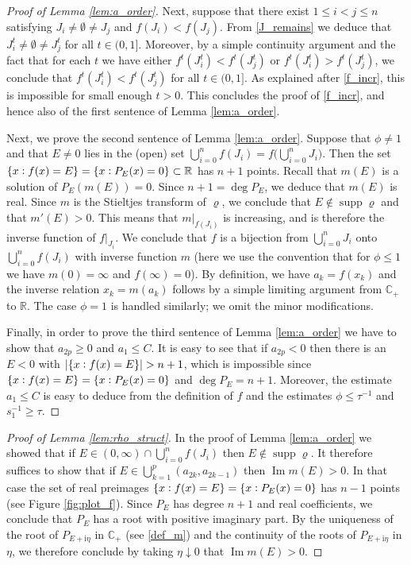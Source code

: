 \documentclass[11pt]{article} %
\numberwithin{equation}{section}
\numberwithin{figure}{section}
\theoremstyle{plain} %
\theoremstyle{definition} %
\newcommand{\R}{\mathbb{R}}
\newcommand{\C}{\mathbb{C}}
\newcommand{\ii}{\mathrm{i}}
\newcommand{\col}{\mathrel{\vcenter{\baselineskip0.75ex \lineskiplimit0pt \hbox{.}\hbox{.}}}}
\renewcommand{\leq}{\leqslant}
\renewcommand{\geq}{\geqslant}
\newcommand{\pb}[1]{\bigl({#1}\bigr)}
\newcommand{\h}[1]{\{{#1}\}}
\newcommand{\abs}[1]{\lvert #1 \rvert}
\DeclareMathOperator{\supp}{supp}
\DeclareMathOperator{\im}{Im}
\begin{document}
\begin{proof}[Proof of Lemma \ref{lem:a_order}]
Next, suppose that there exist $1 \leq i < j \leq n$ satisfying $J_i \neq \emptyset \neq J_j$ and $f(J_i) < f(J_j)$. From \eqref{J_remains} we deduce that $J_i^t \neq \emptyset \neq J_j^t$ for all $t \in (0,1]$. Moreover, by a simple continuity argument and the fact that for each $t$ we have either $f^t(J_i^t) < f^t(J_j^t)$ or  $f^t(J_i^t) > f^t(J_j^t)$, we conclude that $f^t(J_i^t) < f^t(J_j^t)$ for all $t \in (0,1]$. As explained after \eqref{f_incr}, this is impossible for small enough $t > 0$. This concludes the proof of \eqref{f_incr}, and hence also of the first sentence of Lemma \ref{lem:a_order}.

Next, we prove the second sentence of Lemma \ref{lem:a_order}. Suppose that $\phi \neq 1$ and that $E \neq 0$ lies in the (open) set $\bigcup_{i = 0}^n f(J_i) = f \pb{\bigcup_{i = 0}^n J_i}$. Then the set $\h{x \col f(x) = E} = \h{x \col P_E(x) = 0} \subset \R$ has $n+1$ points. Recall that $m(E)$ is a solution of $P_{E}(m(E)) = 0$. Since $n+1 = \deg P_E$, we deduce that $m(E)$ is real. Since $m$ is the Stieltjes transform of $\varrho$, we conclude that $E \notin \supp \varrho$ and that $m'(E) > 0$. This means that $m \vert_{f(J_i)}$ is increasing, and is therefore the inverse function of $f \vert_{J_i}$. We conclude that $f$ is a bijection from $\bigcup_{i = 0}^n J_i$ onto $\bigcup_{i = 0}^n f(J_i)$ with inverse function $m$ (here we use the convention that for $\phi \leq 1$ we have $m(0) = \infty$ and $f(\infty) = 0$). By definition, we have $a_k = f(x_k)$ and the inverse relation $x_k = m(a_k)$ follows by a simple limiting argument from $\C_+$ to $\R$.
The case $\phi = 1$ is handled similarly; we omit the minor modifications.

Finally, in order to prove the third sentence of Lemma \ref{lem:a_order} we have to show that $a_{2p} \geq 0$ and $a_1 \leq C$. It is easy to see that if $a_{2p} < 0$ then there is an $E < 0$ with $\abs{\{x \col f(x) = E\}} > n+1$, which is impossible since $\{x \col f(x) = E\} = \{x \col P_E(x) = 0\}$ and $\deg P_E = n+1$. Moreover, the estimate $a_1 \leq C$ is easy to deduce from the definition of $f$ and the estimates $\phi \leq \tau^{-1}$ and $s_1^{-1} \geq \tau$.
\end{proof}



\begin{proof}[Proof of Lemma \ref{lem:rho_struct}]
In the proof of Lemma \ref{lem:a_order} we showed that if $E \in (0,\infty) \cap \bigcup_{i = 0}^n f(J_i)$ then $E \notin \supp \varrho$. It therefore suffices to show that if $E \in \bigcup_{k = 1}^p (a_{2k}, a_{2k - 1})$ then $\im m(E) > 0$. In that case the set of real preimages $\{x \col f(x) = E\} = \{x \col P_E(x) = 0\}$ has $n - 1$ points (see Figure \ref{fig:plot_f}). Since $P_E$ has degree $n+1$ and real coefficients, we conclude that $P_E$ has a root with positive imaginary part. By the uniqueness of the root of $P_{E + \ii \eta}$ in $\C_+$ (see \eqref{def_m}) and the continuity of the roots of $P_{E + \ii \eta}$ in $\eta$, we therefore conclude by taking $\eta \downarrow 0$ that $\im m(E) > 0$.
\end{proof}
\end{document}

